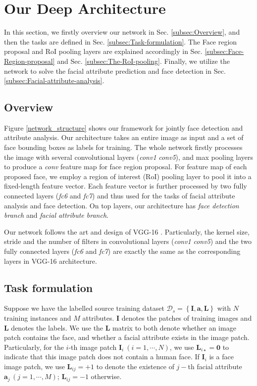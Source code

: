\documentclass[10pt,twocolumn,letterpaper]{article}
\begin{document}
\section{Our Deep Architecture }

In this section, we firstly overview our network in Sec. \ref{subsec:Overview},
and then the tasks are defined in Sec. \ref{subsec:Task-formulation}.
The Face region proposal and RoI pooling layers are explained accordingly
in Sec. \ref{subsec:Face-Region-proposal} and Sec. \ref{subsec:The-RoI-pooling}.
Finally, we utilize the network to solve the facial attribute prediction
and face detection in Sec. \ref{subsec:Facial-attribute-analysis}. 

\subsection{Overview\label{subsec:Overview}}

Figure \ref{network_structure} shows our framework for jointly face
detection and attribute analysis. Our architecture takes an entire
image as input and a set of face bounding boxes as labels for training. The whole
network firstly processes the image with several convolutional layers
(\emph{conv1}\textendash{} \emph{conv5}), and max pooling layers to
produce a \emph{conv} feature map for face region proposal. For feature
map of each proposed face, we employ a region of interest (RoI) pooling
layer to pool it into a fixed-length feature vector. Each feature
vector is further processed by two fully connected layers (\emph{fc6}
and \emph{fc7}) and thus used for the tasks of facial attribute analysis
and face detection. On top layers, our architecture has \emph{face
detection branch} and \emph{facial attribute branch}. 

Our network follows the art and design of VGG-16 \cite{returnDevil2014BMVC}.
Particularly, the kernel size, stride and the number of filters in
convolutional layers (\emph{conv1}\textendash{} \emph{conv5}) and
the two fully connected layers (\emph{fc6} and \emph{fc7}) are exactly
the same as the corresponding layers in VGG-16 architecture.

\subsection{Task formulation\label{subsec:Task-formulation}}

Suppose we have the labelled source training dataset $\mathcal{D}_{s}=\left\{ \mathbf{I},\mathbf{a},\mathbf{L}\right\} $
with $N$ training instances and $M$ attributes. $\mathbf{I}$ denotes
the patches of training images and $\mathbf{L}$ denotes the labels. We use the $\mathbf{L}$ matrix to
both denote whether an image patch contains the face, and whether
a facial attribute exists in the image patch. Particularly, for the
$i$-th image patch $\mathbf{I}_{i}\:(i=1,\cdots,N)$, we use $\mathbf{L}_{i\star}=\mathbf{0}$
to indicate that this image patch does not contain a human face. If
$\mathbf{I}_{i}$ is a face image patch, we use $\mathbf{L}_{ij}=+1$
to denote the existence of $j-$th facial attribute $\mathbf{a}_{j}\,(j=1,\cdots,M)$;
$\mathbf{L}_{ij}=-1$ otherwise. 
\end{document}
